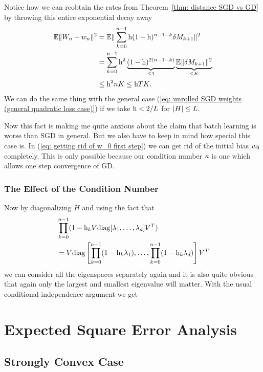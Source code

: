 Notice how we can reobtain the rates from Theorem~\ref{thm: distance SGD vs GD}
by throwing this entire exponential decay away
\begin{align*}
	\mathbb{E}\|W_n-w_n\|^2
	&= \mathbb{E}\|\sum_{k=0}^{n-1}\text{h}(1-\text{h})^{n-1-k}\delta M_{k+1}\|^2\\
	&= \sum_{k=0}^{n-1}\text{h}^2\underbrace{(1-\text{h})^{2(n-1-k)}}_{\le1}
	\underbrace{\mathbb{E}\|\delta M_{k+1}\|^2}_{\le K}\\
	&\le \text{h}^2 n K \le \text{h} TK.
\end{align*}
We can do the same thing with the general case (\ref{eq: unrolled SGD weights
(general quadratic loss case)}) if we take \(\text{h}<2/L\) for \(|H|\le L\).

Now this fact is making me quite anxious about the claim that batch learning is
worse than SGD in general. But we also have to keep in mind how special this
case is. In (\ref{eq: getting rid of w_0 first step}) we can get rid of the
initial bias \(w_0\) completely. This is only possible because our
condition number \(\kappa\) is one which allows one step convergence of GD.

\subsubsection{The Effect of the Condition Number}

Now by diagonalizing \(H\) and using the fact that
\begin{align*}
	&\prod_{k=0}^{n-1} (1-\text{h}_k V\text{diag}[\lambda_1, \dots, \lambda_d]V^T)\\
	&= V \text{diag}\left[
		\prod_{k=0}^{n-1}(1-\text{h}_k\lambda_1),
		\dots, \prod_{k=0}^{n-1}(1-\text{h}_k\lambda_d)
	\right]V^T
\end{align*}
we can consider all the eigenspaces separately again and it is also quite
obvious that again only the largest and smallest eigenvalue will matter.
With the usual conditional independence argument we get

\section{Expected Square Error Analysis}

\subsection{Strongly Convex Case}

